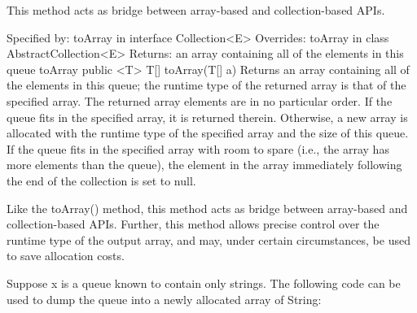\documentclass{book}
\begin{document}
This method acts as bridge between array-based and collection-based APIs.

Specified by:
toArray in interface Collection<E>
Overrides:
toArray in class AbstractCollection<E>
Returns:
an array containing all of the elements in this queue
toArray
public <T> T[] toArray(T[] a)
Returns an array containing all of the elements in this queue; the runtime type of the returned array is that of the specified array. The returned array elements are in no particular order. If the queue fits in the specified array, it is returned therein. Otherwise, a new array is allocated with the runtime type of the specified array and the size of this queue.
If the queue fits in the specified array with room to spare (i.e., the array has more elements than the queue), the element in the array immediately following the end of the collection is set to null.

Like the toArray() method, this method acts as bridge between array-based and collection-based APIs. Further, this method allows precise control over the runtime type of the output array, and may, under certain circumstances, be used to save allocation costs.

Suppose x is a queue known to contain only strings. The following code can be used to dump the queue into a newly allocated array of String:
\end{document}

